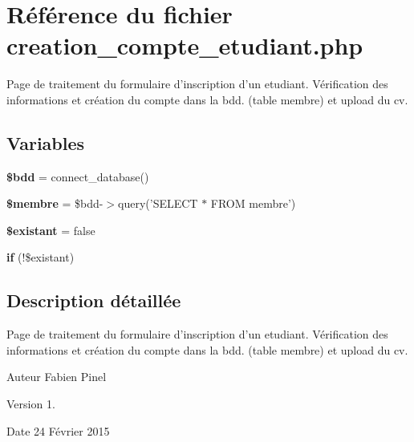 \hypertarget{creation__compte__etudiant_8php}{\section{Référence du fichier creation\-\_\-compte\-\_\-etudiant.\-php}
\label{creation__compte__etudiant_8php}
}


Page de traitement du formulaire d'inscription d'un etudiant. Vérification des informations et création du compte dans la bdd. (table membre) et upload du cv.  


\subsection*{Variables}
\begin{DoxyCompactItemize}
\item 
\hypertarget{creation__compte__etudiant_8php_a94f91e878bce0991e2cd595c5dd79b3f}{{\bfseries \$bdd} = connect\-\_\-database()}\label{creation__compte__etudiant_8php_a94f91e878bce0991e2cd595c5dd79b3f}

\item 
\hypertarget{creation__compte__etudiant_8php_aa000a46a528298c316b1fdf788402a63}{{\bfseries \$membre} = \$bdd-\/$>$query('S\-E\-L\-E\-C\-T $\ast$ F\-R\-O\-M membre')}\label{creation__compte__etudiant_8php_aa000a46a528298c316b1fdf788402a63}

\item 
\hypertarget{creation__compte__etudiant_8php_a3289caad8efe0a8b4dffdfc5d252d16f}{{\bfseries \$existant} = false}\label{creation__compte__etudiant_8php_a3289caad8efe0a8b4dffdfc5d252d16f}

\item 
\hypertarget{creation__compte__etudiant_8php_ae323bae9e4555e3f7c972a5acd2cb3e9}{{\bfseries if} (!\$existant)}\label{creation__compte__etudiant_8php_ae323bae9e4555e3f7c972a5acd2cb3e9}

\end{DoxyCompactItemize}


\subsection{Description détaillée}
Page de traitement du formulaire d'inscription d'un etudiant. Vérification des informations et création du compte dans la bdd. (table membre) et upload du cv. \begin{DoxyAuthor}{Auteur}
Fabien Pinel 
\end{DoxyAuthor}
\begin{DoxyVersion}{Version}
1. 
\end{DoxyVersion}
\begin{DoxyDate}{Date}
24 Février 2015 
\end{DoxyDate}
